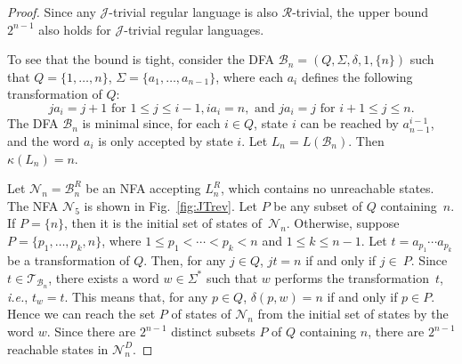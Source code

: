 \documentclass{llncs}
\renewcommand{\le}{\leqslant}
\newcommand{\Sig}{\Sigma}
\newcommand{\txt}[1]{\mbox{ #1 }}
\newcommand{\ie}{\mbox{\it i.e.}}
\newcommand{\cB}{{\mathcal B}}
\newcommand{\cN}{{\mathcal N}}
\newcommand{\cT}{{\mathcal T}}
\newcommand{\gR}{{\mathcal R}}
\newcommand{\gJ}{{\mathcal J}}
\begin{document}
\begin{proof}
Since any $\gJ$-trivial regular language is also $\gR$-trivial, the upper bound $2^{n-1}$ also holds for $\gJ$-trivial regular languages. 

To see that the bound is tight, consider the DFA $\cB_n = (Q, \Sig, \delta, 1, \{n\})$ such that $Q = \{1,\ldots,n\}$, $\Sig = \{a_1,\ldots,a_{n-1}\}$, where each $a_i$ defines the following transformation of $Q$: 
$$ja_i = j+1 \txt{for} 1 \le j \le i-1, ia_i = n, \txt{and} ja_i = j \txt{for} i+1 \le j \le n.$$
The DFA $\cB_n$ is minimal since, for each $i \in Q$, state $i$ can be reached by $a_{n-1}^{i-1}$, and the word $a_i$ is only accepted by state $i$. Let $L_n = L(\cB_n)$. Then $\kappa(L_n) = n$. 

Let $\cN_n = \cB_n^R$ be an NFA accepting $L_n^R$, which contains no unreachable states. The NFA $\cN_5$ is shown in Fig.~\ref{fig:JTrev}. Let $P$ be any subset of $Q$ containing~$n$. If $P = \{n\}$, then it is the initial set of states of~$\cN_n$. Otherwise, suppose $P = \{p_1,\ldots,p_k,n\}$, where $1 \le p_1 < \cdots < p_k < n$ and $1 \le k \le n-1$. Let $t = a_{p_1} \cdots a_{p_k}$ be a transformation of $Q$. Then, for any $j \in Q$, $jt = n$ if and only if $j \in~P$. Since $t \in \cT_{\cB_n}$, there exists a word $w \in \Sig^*$ such that $w$ performs the transformation~$t$, \ie, $t_w = t$. This means that, for any $p \in Q$, $\delta(p, w) = n$ if and only if $p \in P$. Hence we can reach the set $P$ of states of $\cN_n$ from the initial set of states by the word $w$. Since there are $2^{n-1}$ distinct subsets $P$ of $Q$ containing $n$, there are $2^{n-1}$ reachable states in $\cN_n^D$. 


\end{proof}
\end{document}
